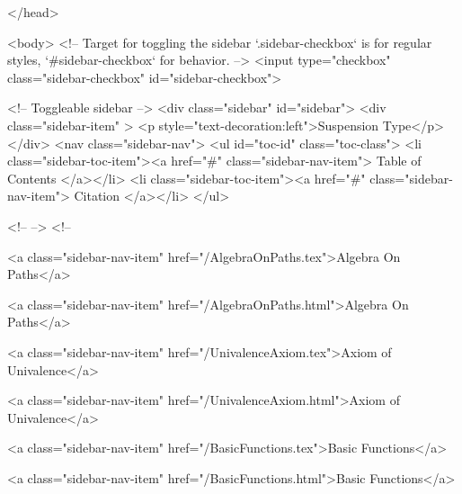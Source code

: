   
</head>




  <body>
    <!-- Target for toggling the sidebar `.sidebar-checkbox` is for regular
     styles, `#sidebar-checkbox` for behavior. -->
<input type="checkbox" class="sidebar-checkbox" id="sidebar-checkbox">

<!-- Toggleable sidebar -->
<div class="sidebar" id="sidebar">
  <div class="sidebar-item" >
    <p style="text-decoration:left">Suspension Type</p>
  </div>
  <nav class="sidebar-nav">
    <ul id="toc-id" class="toc-class">
  <li class="sidebar-toc-item"><a href="#" class="sidebar-nav-item"> Table of Contents </a></li>
  <li class="sidebar-toc-item"><a href="#" class="sidebar-nav-item"> Citation </a></li>
</ul>


    <!--  -->
    <!-- 
      
    
      
    
      
    
      
        
      
    
      
        
          <a class="sidebar-nav-item" href="/AlgebraOnPaths.tex">Algebra On Paths</a>
        
      
    
      
        
          <a class="sidebar-nav-item" href="/AlgebraOnPaths.html">Algebra On Paths</a>
        
      
    
      
        
          <a class="sidebar-nav-item" href="/UnivalenceAxiom.tex">Axiom of Univalence</a>
        
      
    
      
        
          <a class="sidebar-nav-item" href="/UnivalenceAxiom.html">Axiom of Univalence</a>
        
      
    
      
        
          <a class="sidebar-nav-item" href="/BasicFunctions.tex">Basic Functions</a>
        
      
    
      
        
          <a class="sidebar-nav-item" href="/BasicFunctions.html">Basic Functions</a>
        
      
    
      
        
